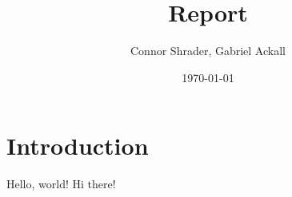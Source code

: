 \documentclass{article}
\title{Report}
\author{Connor Shrader, Gabriel Ackall}
\date{\today}
\begin{document}
\maketitle

\section{Introduction}
Hello, world! Hi there!
\end{document}
